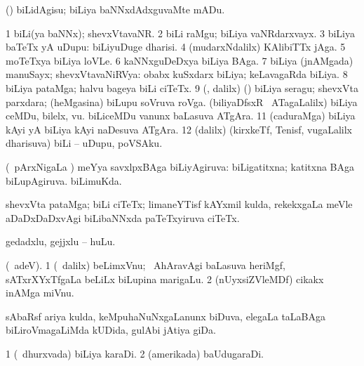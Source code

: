 {{{{{{\bentry
{} 
\gl{\sakirx}
\expl{}
\bmng
(\pArxparx) biLidAgisu; biLiya baNNxdAdxguvaMte mADu. 
\emng
\eentry

\bentry
{} 
\gl{\nA}
\expl{}
\bmng
\bnum
\num{1} biLi(ya baNNx); shevxVtavaNR. 
\num{2} biLi raMgu; biLiya vaNRdarxvayx. 
\num{3} biLiya baTeTx yA uDupu:  biLiyuDuge dharisi. 
\num{4} (mudarxNdalilx) KAlibiTTx jAga. 
\num{5} moTeTxya biLiya loVLe. 
\num{6} kaNNxguDeDxya biLiya BAga. 
\num{7}  biLiya (jnAMgada) manuSayx; shevxVtavaNiRVya:  obabx kuSxdarx biLiya; keLavagaRda biLiya. 
\num{8} biLiya pataMga; halvu bageya biLi ciTeTx. 
\num{9} (\AmA, \bava dalilx) (\veYshA) biLiya seragu; shevxVta parxdara; (heMgasina) biLupu soVruva roVga. 
 (biliyaDfsxR \mo\ ATagaLalilx) 
\banum
{} biLiya ceMDu, bilelx, \mo vu. 
 biLiceMDu \mo vanunx baLasuva ATgAra. 
\eanum
\numie
\num{11} (caduraMga) biLiya kAyi yA biLiya kAyi naDesuva ATgAra. 
\num{12} (\bava dalilx) (kirxkeTf, Tenisf, \mo vugaLalilx dharisuva) biLi -- uDupu, poVSAku. 
\enum
\emng
\eentry

\bentry
{} 
\gl{\sapUpa}
\expl{}
\bmng
(\kanmu\ pArxNigaLa \vi) meYya savxlpxBAga biLiyAgiruva:  biLigatitxna; katitxna BAga biLupAgiruva.  biLimuKda. 
\emng
\eentry

\bentry
{} 
\gl{\nA}
\expl{}
\bmng
shevxVta pataMga; biLi ciTeTx; limaneYTisf kAYxmil kulda, rekekxgaLa meVle aDaDxDaDxvAgi biLibaNNxda paTeTxyiruva ciTeTx. 
\emng
\eentry

\bentry
{}
\gl{\nA}
\bmng
gedadxlu, gejjxlu -- huLu. 
\emng
\eentry

\bentry
{}
  \gl{\nA}\bmng
(\bava\ adeV). 
\bnum
\num{1} (\sA\ \bava dalilx) beLimxVnu; \kanmu\ AhAravAgi baLasuva heriMgf, sATxrXYxTfgaLa beLiLx biLupina marigaLu. 
\num{2} (nUyxsiZVleMDf) cikakx inAMga  miVnu. 
\enum
\emng
\eentry

\bentry
{} 
\gl{\nA}
\expl{}
\bmng
sAbaRsf ariya kulda, keMpuhaNuNxgaLanunx biDuva, elegaLa taLaBAga biLiroVmagaLiMda kUDida, gulAbi jAtiya giDa. 
\emng
\eentry

\bentry
{} 
\gl{\nA}
\expl{}
\bmng
\bnum
\num{1} (\kanu\ dhurxvada) biLiya karaDi. 
\num{2} (amerikada) baUdugaraDi. 
\enum
\emng
\eentry

}}}}}}
